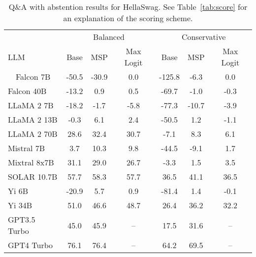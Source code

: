\begin{table*}[h]
\centering
\caption{Q\&A with abstention results for HellaSwag. See Table~\ref{tab:score} for an explanation of the scoring scheme.}
\label{tab:hellaswag_score}
\begin{tabular}{lcccccc}
\toprule
& \multicolumn{3}{c}{Balanced} & \multicolumn{3}{c}{Conservative} \\ 
LLM & Base & MSP & Max Logit & Base & MSP & Max Logit \\ 
\cmidrule(lr){1-1}\cmidrule(lr){2-4}\cmidrule(lr){5-7}\ \ 
Falcon 7B & -50.5 & -30.9 & 0.0 & -125.8 & -6.3 & 0.0\\
Falcon 40B & -13.2 & 0.9 & 0.5 & -69.7 & -1.0 & -0.3\\
LLaMA 2 7B & -18.2 & -1.7 & -5.8 & -77.3 & -10.7 & -3.9\\
LLaMA 2 13B & -0.3 & 6.1 & 2.4 & -50.5 & 1.2 & -1.1\\
LLaMA 2 70B & 28.6 & 32.4 & 30.7 & -7.1 & 8.3 & 6.1\\
Mistral 7B & 3.7 & 10.3 & 9.8 & -44.5 & -9.1 & 1.7\\
Mixtral 8x7B & 31.1 & 29.0 & 26.7 & -3.3 & 1.5 & 3.5\\
SOLAR 10.7B & 57.7 & 58.3 & 57.7 & 36.5 & 41.1 & 36.5\\
Yi 6B & -20.9 & 5.7 & 0.9 & -81.4 & 1.4 & -0.1\\
Yi 34B & 51.0 & 46.6 & 48.7 & 26.4 & 36.2 & 32.2\\
GPT3.5 Turbo & 45.0 & 45.9 & -- & 17.5 & 31.6 & --\\
GPT4 Turbo & 76.1 & 76.4 & -- & 64.2 & 69.5 & --\\
\bottomrule
\end{tabular}
\end{table*}
